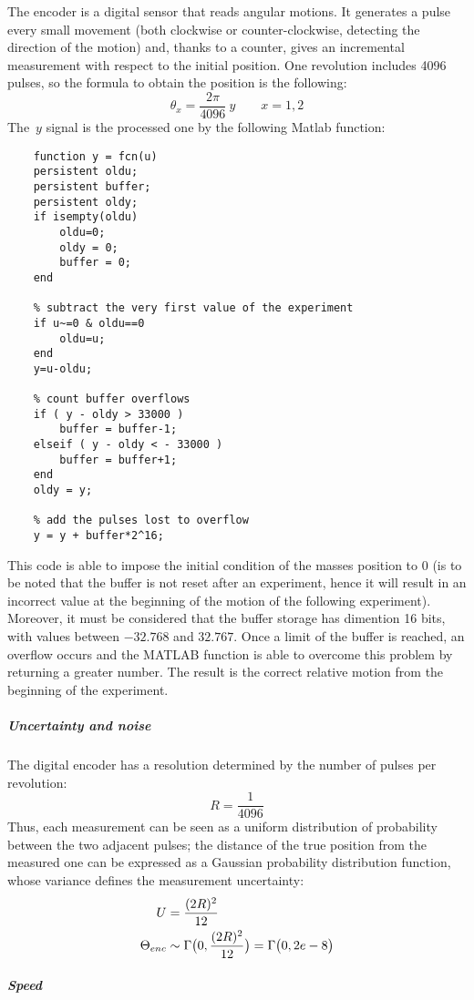 The encoder is a digital sensor that reads angular motions. It generates a pulse every small movement (both clockwise or counter-clockwise, detecting the direction of the motion) and, thanks to a counter, gives an incremental measurement with respect to the initial position. One revolution includes 4096 pulses, so the formula to obtain the position is the following:
\[
	\theta_x = \frac{2\pi}{4096} \ y \qquad x={1,2}
\]
The~$y$ signal is the processed one by the following Matlab function:
\begin{verbatim}
	function y = fcn(u)
	persistent oldu;
	persistent buffer;
	persistent oldy;
	if isempty(oldu)
		oldu=0;
		oldy = 0;
		buffer = 0;
	end
	
	% subtract the very first value of the experiment
	if u~=0 & oldu==0 
		oldu=u;
	end
	y=u-oldu;
	
	% count buffer overflows
	if ( y - oldy > 33000 )
		buffer = buffer-1;
	elseif ( y - oldy < - 33000 )
		buffer = buffer+1;
	end
	oldy = y;
	
	% add the pulses lost to overflow 
	y = y + buffer*2^16;
\end{verbatim}
This code is able to impose the initial condition of the masses position to 0 (is to be noted that the buffer is not reset after an experiment, hence it will result in an incorrect value at the beginning of the motion of the following experiment). Moreover, it must be considered that the buffer storage has dimention 16 bits, with values between $-32.768$ and $32.767$. Once a limit of the buffer is reached, an overflow occurs and the MATLAB function is able to overcome this problem by returning a greater number. The result is the correct relative motion from the beginning of the experiment.

\subparagraph{Uncertainty and noise}

The digital encoder has a resolution determined by the number of pulses per revolution:
\[
	R = \frac{1}{4096}
\]
Thus, each measurement can be seen as a uniform distribution of probability between the two adjacent pulses; the distance of the true position from the measured one can be expressed as a Gaussian probability distribution function, whose variance defines the measurement uncertainty:
\begin{align*}
	U &= \frac{(2R)^2}{12} \\
	\Theta_{enc} &\sim \Gamma \bigl{(} 0,\frac{(2R)^2}{12} \bigr{)} = \Gamma \bigl{(} 0, 2e-8 \bigr{)}
\end{align*}

\subparagraph{Speed}

